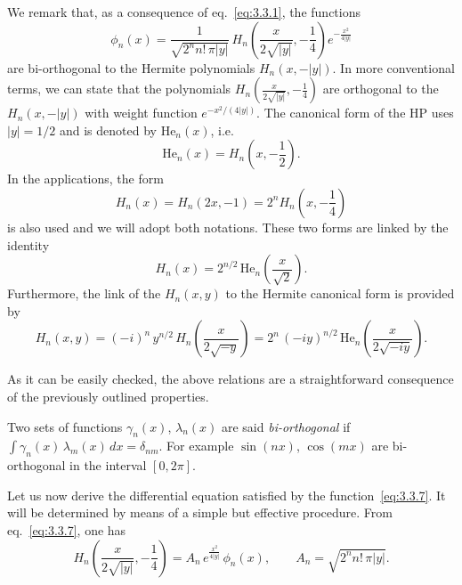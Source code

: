 We remark that, as a consequence of eq.~\eqref{eq:3.3.1}, the
functions
\begin{equation}
\phi_n(x)=\frac{1}{\sqrt{2^n n!\,\pi|y|}}\,
H_n\!\left(\frac{x}{2\sqrt{|y|}},-\frac{1}{4}\right)
e^{-\frac{x^2}{4|y|}}
\label{eq:3.3.7}
\end{equation}
are bi-orthogonal to the Hermite polynomials
$H_n(x,-|y|)$. In more conventional terms, we can state that the
polynomials $H_n\!\left(\frac{x}{2\sqrt{|y|}},-\frac{1}{4}\right)$ are
orthogonal to the $H_n(x,-|y|)$ with weight function
$e^{-x^2/(4|y|)}$. The canonical form of the HP uses $|y|=1/2$ and
is denoted by $\mathrm{He}_n(x)$, i.e.
\begin{equation}
\mathrm{He}_n(x)=H_n\!\left(x,-\frac{1}{2}\right).
\label{eq:3.3.8}
\end{equation}
In the applications, the form
\begin{equation}
H_n(x)=H_n(2x,-1)=2^n H_n\!\left(x,-\frac{1}{4}\right)
\label{eq:3.3.9}
\end{equation}
is also used and we will adopt both notations. These two forms are
linked by the identity
\begin{equation}
H_n(x)=2^{n/2}\,\mathrm{He}_n\!\left(\frac{x}{\sqrt{2}}\right).
\label{eq:3.3.10}
\end{equation}
Furthermore, the link of the $H_n(x,y)$ to the Hermite canonical
form is provided by
\begin{equation}
H_n(x,y)=(-i)^n\,y^{n/2}\,
H_n\!\left(\frac{x}{2\sqrt{-y}}\right)
=2^n\,(-iy)^{n/2}\,
\mathrm{He}_n\!\left(\frac{x}{2\sqrt{-iy}}\right).
\label{eq:3.3.11}
\end{equation}

As it can be easily checked, the above relations are a
straightforward consequence of the previously outlined properties.

 Two sets of functions $\gamma_n(x)$,
$\lambda_n(x)$ are said \emph{bi-orthogonal} if
$\int \gamma_n(x)\,\lambda_m(x)\,dx=\delta_{nm}$. For example
$\sin(nx)$, $\cos(mx)$ are bi-orthogonal in the interval
$[0,2\pi]$.

\medskip
Let us now derive the differential equation satisfied by the
function~\eqref{eq:3.3.7}. It will be determined by means of a
simple but effective procedure. From eq.~\eqref{eq:3.3.7}, one has
\[
H_n\!\left(\frac{x}{2\sqrt{|y|}},-\frac{1}{4}\right)
=A_n\,e^{\frac{x^2}{4|y|}}\,\phi_n(x),\qquad
A_n=\sqrt{2^n n!\,\pi|y|}.
\]

